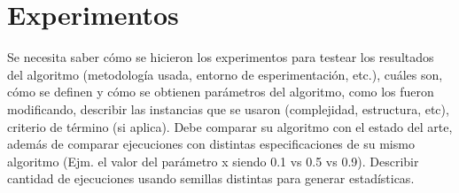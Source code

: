 \section{Experimentos}

Se necesita saber c\'omo se hicieron los experimentos para testear los resultados del algoritmo (metodolog\'ia usada, entorno de esperimentaci\'on, etc.), cu\'ales son, c\'omo se definen y c\'omo se obtienen par\'ametros del algoritmo, como los fueron modificando, describir las instancias que se usaron (complejidad, estructura, etc), criterio de t\'ermino (si aplica). Debe comparar su algoritmo con el estado del arte, adem\'as de comparar ejecuciones con distintas especificaciones de su mismo algoritmo (Ejm. el valor del par\'ametro x siendo 0.1 vs 0.5 vs 0.9). Describir cantidad de ejecuciones usando semillas distintas para generar estad\'isticas.
